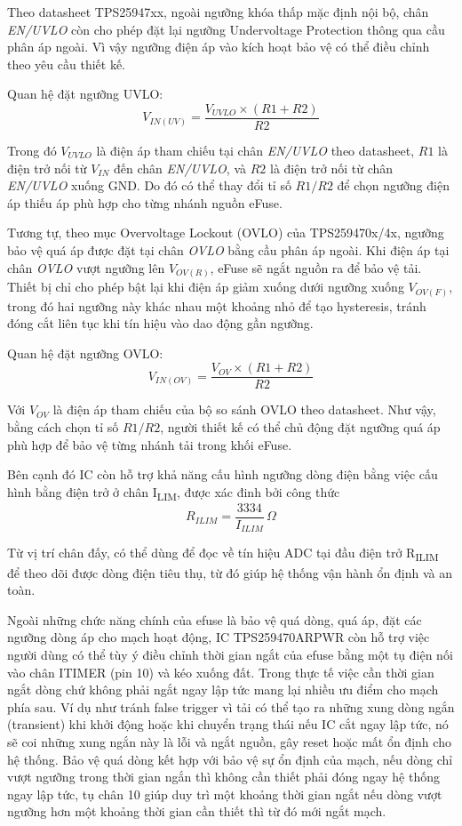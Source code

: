 Theo datasheet TPS25947xx, ngoài ngưỡng khóa thấp mặc định nội bộ, chân \textit{EN/UVLO} còn cho phép đặt lại ngưỡng Undervoltage Protection thông qua cầu phân áp ngoài. Vì vậy ngưỡng điện áp vào kích hoạt bảo vệ có thể điều chỉnh theo yêu cầu thiết kế.

Quan hệ đặt ngưỡng UVLO:
\begin{equation}
V_{IN(UV)} = \frac{V_{UVLO}\times(R1+R2)}{R2}
\end{equation}

Trong đó \(V_{UVLO}\) là điện áp tham chiếu tại chân \textit{EN/UVLO} theo datasheet, \(R1\) là điện trở nối từ \(V_{IN}\) đến chân \textit{EN/UVLO}, và \(R2\) là điện trở nối từ chân \textit{EN/UVLO} xuống GND. Do đó có thể thay đổi tỉ số \(R1/R2\) để chọn ngưỡng điện áp thiếu áp phù hợp cho từng nhánh nguồn eFuse.

Tương tự, theo mục Overvoltage Lockout (OVLO) của TPS259470x/4x, ngưỡng bảo vệ quá áp được đặt tại chân \textit{OVLO} bằng cầu phân áp ngoài. Khi điện áp tại chân \textit{OVLO} vượt ngưỡng lên \(V_{OV(R)}\), eFuse sẽ ngắt nguồn ra để bảo vệ tải. Thiết bị chỉ cho phép bật lại khi điện áp giảm xuống dưới ngưỡng xuống \(V_{OV(F)}\), trong đó hai ngưỡng này khác nhau một khoảng nhỏ để tạo hysteresis, tránh đóng cắt liên tục khi tín hiệu vào dao động gần ngưỡng.

Quan hệ đặt ngưỡng OVLO:
\begin{equation}
V_{IN(OV)} = \frac{V_{OV}\times(R1+R2)}{R2}
\end{equation}

Với \(V_{OV}\) là điện áp tham chiếu của bộ so sánh OVLO theo datasheet. Như vậy, bằng cách chọn tỉ số \(R1/R2\), người thiết kế có thể chủ động đặt ngưỡng quá áp phù hợp để bảo vệ từng nhánh tải trong khối eFuse.

Bên cạnh đó IC còn hỗ trợ khả năng cấu hình ngưỡng dòng điện bằng việc cấu hình bằng điện trở ở chân I\textsubscript{LIM}, được xác đinh bởi công thức 
\begin{equation}
R_{ILIM}= \frac{3334}{I_{ILIM}} \,\Omega
\end{equation}

Từ vị trí chân đấy, có thể dùng để đọc về tín hiệu ADC tại đầu điện trở R\textsubscript{ILIM} để theo dõi được dòng điện tiêu thụ, từ đó giúp hệ thống vận hành ổn định và an toàn.

Ngoài những chức năng chính của efuse là bảo vệ quá dòng, quá áp, đặt các ngưỡng dòng áp cho mạch hoạt động, IC TPS259470ARPWR còn hỗ trợ việc người dùng có thể tùy ý điều chỉnh thời gian ngắt của efuse bằng một tụ điện nối vào chân ITIMER (pin 10) và kéo xuống đất. Trong thực tế việc cần thời gian ngắt dòng chứ không phải ngắt ngay lập tức mang lại nhiều ưu điểm cho mạch phía sau. Ví dụ như tránh false trigger vì tải có thể tạo ra những xung dòng ngắn (transient) khi khởi động hoặc khi chuyển trạng thái nếu IC cắt ngay lập tức, nó sẽ coi những xung ngắn này là lỗi và ngắt nguồn, gây reset hoặc mất ổn định cho hệ thống. Bảo vệ quá dòng kết hợp với bảo vệ sự ổn định của mạch, nếu dòng chỉ vượt ngưỡng trong thời gian ngắn thì không cần thiết phải đóng ngay hệ thống ngay lập tức, tụ chân 10 giúp duy trì một khoảng thời gian ngắt nếu dòng vượt ngưỡng hơn một khoảng thời gian cần thiết thì từ đó mới ngắt mạch.


